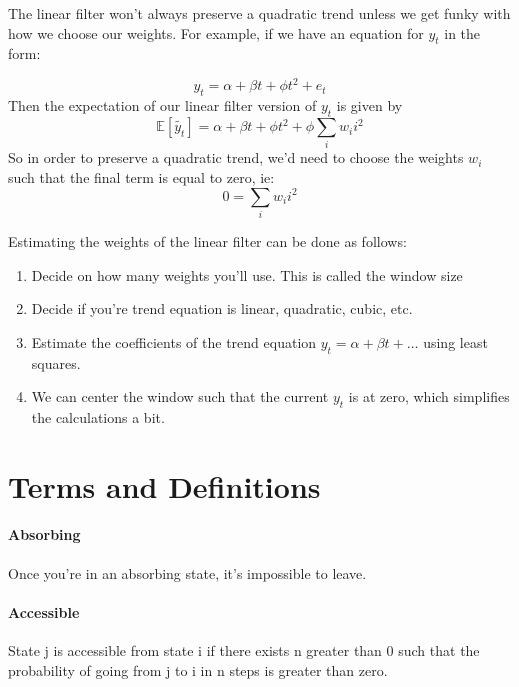 \documentclass[12pt]{article}
\begin{document}
        The linear filter won't always preserve a quadratic trend unless we get funky with
        how we choose our weights. For example, if we have an equation for $y_t$ in the
        form:

        \begin{equation*}
            y_t = \alpha + \beta t + \phi t^2 + e_t
        \end{equation*}
        Then the expectation of our linear filter version of $y_t$ is given by
        \begin{equation*}
            \mathbb{E}[\tilde{y_t}] = \alpha + \beta t + \phi t^2 + \phi \sum_i w_i i^2
        \end{equation*}
        So in order to preserve a quadratic trend, we'd need to choose the weights $w_i$ such
        that the final term is equal to zero, ie:
        \begin{equation*}
            0 = \sum_i w_i i^2
        \end{equation*}


        Estimating the weights of the linear filter can be done as follows:
        \begin{enumerate} 
            \item Decide on how many weights you'll use. This is called the window
                size
            \item Decide if you're trend equation is linear, quadratic, cubic, etc.
            \item Estimate the coefficients of the trend equation $y_t = \alpha + \beta t + \dots$ using least squares.
            \item We can center the window such that the current $y_t$ is at zero, which
                simplifies the calculations a bit.
        \end{enumerate} 




\section{Terms and Definitions}
    \paragraph{Absorbing} Once you're in an absorbing state, it's impossible to leave.
    \paragraph{Accessible} State j is accessible from state i if there exists n greater than 0 such that the probability of going from j to i in n steps is greater than zero.
\end{document}
